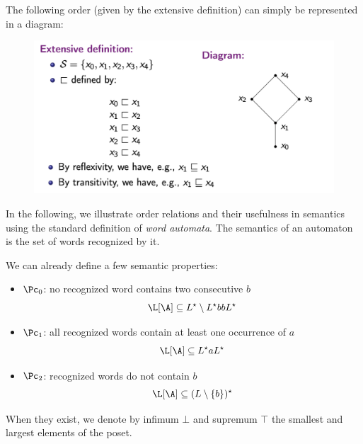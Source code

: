\documentclass[toc]{../cs-classes/cs-classes}
\begin{document}
\begin{example}
    The following order (given by the extensive definition) can simply be represented in a diagram:
    \begin{figure}[H]
        \centering
        \includegraphics[scale=0.6]{images/hass-diagram.png}
    \end{figure}
\end{example}

In the following, we illustrate order relations and their usefulness in semantics using the standard definition of \emph{word automata}. The semantics of an automaton is the set of words recognized by it.

We can already define a few semantic properties:
\begin{itemize}
    \item $\Pc_0$: no recognized word contains two consecutive $b$
    \begin{equation*}
        \L[\A]\subseteq L^\star\setminus L^\star bb L^\star
    \end{equation*}
    \item $\Pc_1$: all recognized words contain at least one occurrence of $a$
    \begin{equation*}
        \L[\A]\subseteq L^\star aL^\star
    \end{equation*}
    \item $\Pc_2$: recognized words do not contain $b$
    \begin{equation*}
        \L[\A]\subseteq (L\setminus \{b\})^\star
    \end{equation*}
\end{itemize}

\begin{definition}[$\bot$, $\top$]
    When they exist, we denote by infimum $\bot$ and supremum $\top$ the smallest and largest elements of the poset.
\end{definition}
\end{document}
